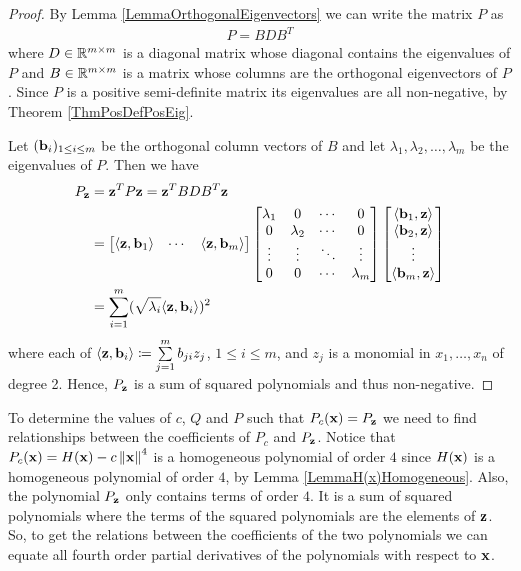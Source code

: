 \documentclass[a4paper,12pt,twoside,BCOR=10mm]{scrbook}
\begin{document}
\begin{proof}
By Lemma \ref{LemmaOrthogonalEigenvectors} we can write the matrix $P$ as
\begin{align*}
    P = BDB^T
\end{align*}
where $D \in \mathbb{R}^{m \times m}$ is a diagonal matrix whose diagonal contains the eigenvalues of $P$ and $B \in \mathbb{R}^{m \times m}$ is a matrix whose columns are the orthogonal eigenvectors of $P$. Since $P$ is a positive semi-definite matrix its eigenvalues are all non-negative, by Theorem \ref{ThmPosDefPosEig}.

Let $(\mathbf{b}_i)_{1\leq i \leq m}$ be the orthogonal column vectors of $B$
and let $\lambda_1, \lambda_2, \ldots, \lambda_m$ be the eigenvalues of $P$. Then we have
\begin{align*}
    P_{\mathbf{z}} &= \mathbf{z}^T P \mathbf{z} = \mathbf{z}^T B D B^T \mathbf{z}\\
    &= \begin{bmatrix}
    \langle \mathbf{z}, \mathbf{b}_1 \rangle & \cdots & \langle \mathbf{z}, \mathbf{b}_m \rangle
    \end{bmatrix}
    \begin{bmatrix}
    \lambda_1 & 0 & \cdots & 0\\
    0 & \lambda_2 & \cdots & 0\\
    \vdots & \vdots & \ddots & \vdots\\
    0 & 0 & \cdots & \lambda_m
    \end{bmatrix}
    \begin{bmatrix}
    \langle \mathbf{b}_1, \mathbf{z} \rangle\\
    \langle \mathbf{b}_2, \mathbf{z} \rangle\\
    \vdots\\
    \langle \mathbf{b}_m, \mathbf{z} \rangle
    \end{bmatrix}\\
    &= \sum_{i = 1}^m (\sqrt{\lambda_i}\langle \mathbf{z}, \mathbf{b}_i \rangle)^2
\end{align*}
where each of $\langle \mathbf{z}, \mathbf{b}_i \rangle \coloneqq \sum\limits_{j = 1}^m b_{ji}z_j$, $1 \leq i \leq m$, and $z_j$ is a monomial in $x_1, \ldots, x_n$ of degree 2. Hence, $P_{\mathbf{z}}$ is a sum of squared polynomials and thus non-negative.
\end{proof}

To determine the values of $c$, $Q$ and $P$ such that $P_c(\mathbf{x}) = P_{\mathbf{z}}$ we need to find relationships between the coefficients of $P_c$ and $P_{\mathbf{z}}$. Notice that $P_c(\mathbf{x}) = H(\mathbf{x}) - c\left\lVert\mathbf{x}\right\rVert^4$ is a homogeneous polynomial of order $4$ since $H(\mathbf{x})$ is a homogeneous polynomial of order $4$, by Lemma \ref{LemmaH(x)Homogeneous}. Also, the polynomial $P_{\mathbf{z}}$ only contains terms of order $4$. It is a sum of squared polynomials where the terms of the squared polynomials are the elements of $\mathbf{z}$. So, to get the relations between the coefficients of the two polynomials we can equate all fourth order partial derivatives of the polynomials with respect to $\mathbf{x}$.
\end{document}
